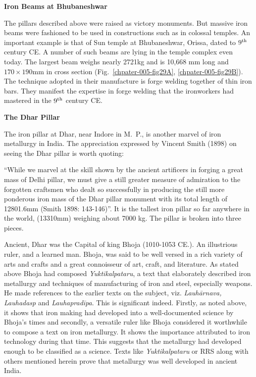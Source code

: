 \vspace{-.3cm}

\noindent \textbf{\large Iron Beams at Bhubaneshwar}

The pillars described above were raised as victory monuments. But massive iron beams were fashioned to be used in constructions such as in colossal temples. An important example is that of Sun temple at Bhubaneshwar, Orissa, dated to $9^{\rm th}$ century CE. A number of such beams are lying in the temple complex even today. The largest beam weighs nearly 2721kg and is 10,668 mm long and $170 \times 190$mm in cross section  (Fig.~\ref{chpater-005-fig29A}, \ref{chpater-005-fig29B}). The technique adopted in their manufacture is forge welding together of thin iron bars. They manifest the expertise in forge welding that the ironworkers had mastered in the $9^{\rm th}$ century CE.

\noindent \textbf{\large The Dhar Pillar}

The iron pillar at Dhar, near Indore in M.~P., is another marvel of iron metallurgy in India. The appreciation expressed by Vincent Smith (1898) on seeing the Dhar pillar is worth quoting: 

“While we marvel at the skill shown by the ancient artificers in forging a great mass of Delhi pillar, we must give a still greater measure of admiration to the forgotten craftsmen who dealt so successfully in producing the still more ponderous iron mass of the Dhar pillar monument with its total length of 12801.6mm (Smith 1898: 143-146)”. It is the tallest iron pillar so far anywhere in the world, (13310mm) weighing about 7000 kg. The pillar is broken into three pieces.

Ancient, Dhar was the Capital of king Bhoja (1010-1053 CE.). An illustrious ruler, and a learned man. Bhoja, was said to be well versed in a rich variety of arts and crafts and a great connoisseur of art, craft, and literature. As stated above Bhoja had composed {\it Yuktikalpataru}, a text that elaborately described iron metallurgy and techniques of manufacturing of iron and steel, especially weapons. He made references to the earlier texts on the subject, viz. {\it Lauhārnava, Lauhadasp} and {\it Lauhapradīpa}. This is significant indeed. Firstly, as noted above, it shows that iron making had developed into a well-documented science by Bhoja's times and secondly, a versatile ruler like Bhoja considered it worthwhile to compose a text on iron metallurgy. It shows the importance attributed to iron technology during that time. This suggests that the metallurgy had developed enough to be classified as a science. Texts like {\it Yuktikalpataru} or RRS along with others mentioned herein prove that metallurgy was well developed in ancient India. 

